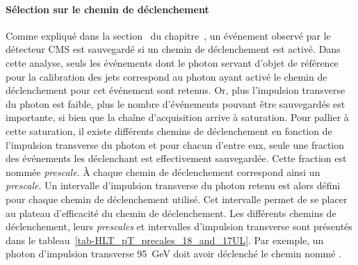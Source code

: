 \paragraph{Sélection sur le chemin de déclenchement}
Comme expliqué dans la section~ du chapitre~, un événement observé par le détecteur CMS est sauvegardé si un chemin de déclenchement est activé.
Dans cette analyse, seuls les événements dont le photon servant d'objet de référence pour la calibration des jets correspond au photon ayant activé le chemin de déclenchement pour cet événement sont retenus.
Or, plus l'impulsion transverse du photon est faible, plus le nombre d'événements pouvant être sauvegardés est importante, si bien que la chaîne d'acquisition arrive à saturation.
Pour pallier à cette saturation, il existe différents chemins de déclenchement en fonction de l'impulsion transverse du photon et pour chacun d'entre eux, seule une fraction des événements les déclenchant est effectivement sauvegardée.
Cette fraction est nommée \emph{prescale}.
À chaque chemin de déclenchement correspond ainsi un \emph{prescale}.
Un intervalle d'impulsion transverse du photon retenu est alors défini pour chaque chemin de déclenchement utilisé.
Cet intervalle permet de se placer au plateau d'efficacité du chemin de déclenchement.
Les différents chemins de déclenchement, leurs \emph{prescales} et intervalles d'impulsion transverse sont présentés dans le tableau~\ref{tab-HLT_pT_precales_18_and_17UL}.
Par exemple, un photon d'impulsion transverse \SI{95}{\GeV} doit avoir déclenché le chemin nommé .
